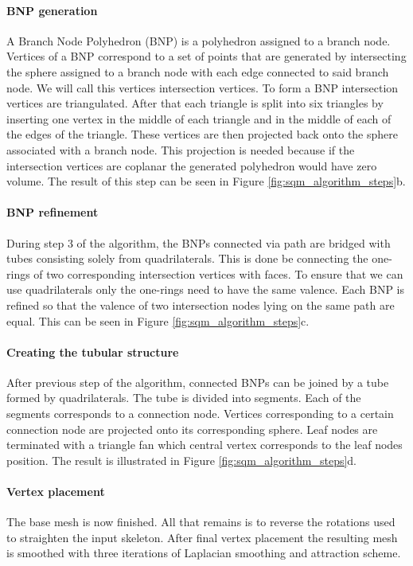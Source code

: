 \paragraph{BNP generation}
A Branch Node Polyhedron (BNP) is a polyhedron assigned to a branch node. Vertices of a BNP correspond to a set of points that are generated by intersecting the sphere assigned to a branch node with each edge connected to said branch node. We will call this vertices intersection vertices. To form a BNP intersection vertices are triangulated. After that each triangle is split into six triangles by inserting one vertex in the middle of each triangle and in the middle of each of the edges of the triangle. These vertices are then projected back onto the sphere associated with a branch node. This projection is needed because if the intersection vertices are coplanar the generated polyhedron would have zero volume. The result of this step can be seen in Figure \ref{fig:sqm_algorithm_steps}b.

\paragraph{BNP refinement}
During step 3 of the algorithm, the BNPs connected via path are bridged with tubes consisting solely from quadrilaterals. This is done be connecting the one-rings of two corresponding intersection vertices with faces. To ensure that we can use quadrilaterals only the one-rings need to have the same valence. Each BNP is refined so that the valence of two intersection nodes lying on the same path are equal. This can be seen in Figure \ref{fig:sqm_algorithm_steps}c.

\paragraph{Creating the tubular structure}
After previous step of the algorithm, connected BNPs can be joined by a tube formed by quadrilaterals. The tube is divided into segments. Each of the segments corresponds to a connection node. Vertices corresponding to a certain connection node are projected onto its corresponding sphere. Leaf nodes are terminated with a triangle fan which central vertex corresponds to the leaf nodes position. The result is illustrated in Figure \ref{fig:sqm_algorithm_steps}d.

\paragraph{Vertex placement}
The base mesh is now finished. All that remains is to reverse the rotations used to straighten the input skeleton. After final vertex placement the resulting mesh is smoothed with three iterations of Laplacian smoothing and attraction scheme.

